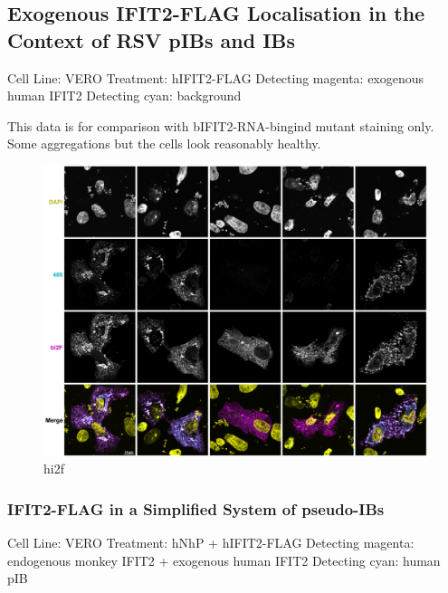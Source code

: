 \subsection{Exogenous IFIT2-FLAG Localisation in the Context of RSV pIBs and IBs} \label{subsec:Exogenous IFIT2-FLAG Localisation in the Context of RSV pIBs and IBs}
Cell Line: VERO \newline
Treatment: hIFIT2-FLAG \newline
Detecting magenta: exogenous human IFIT2 \newline
Detecting cyan: background \newline

This data is for comparison with bIFIT2-RNA-bingind mutant staining only. Some aggregations but the cells look reasonably healthy.

\begin{figure}
    \centering
    \includegraphics[width=1\linewidth]{10. Chapter 5/Figs/03. IFIT2-FLAG/01. hi2f mock.png}
    \caption[hi2f]{hi2f}
    \label{hi2f}
\end{figure}


\subsubsection{IFIT2-FLAG in a Simplified System of pseudo-IBs} \label{IFIT2-FLAG in a Simplified System of pseudo-IBs}
Cell Line: VERO \newline
Treatment: hNhP + hIFIT2-FLAG \newline
Detecting magenta: endogenous monkey IFIT2 + exogenous human IFIT2 \newline
Detecting cyan: human pIB \newline

